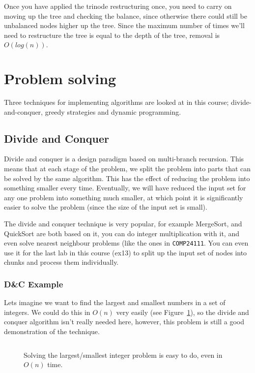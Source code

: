 Once you have applied the trinode restructuring once, you need to carry on
moving up the tree and checking the balance, since otherwise there could still
be unbalanced nodes higher up the tree. Since the maximum number of times we'll
need to restructure the tree is equal to the depth of the tree, removal is
$O(log(n))$.

\section{Problem solving}

Three techniques for implementing algorithms are looked at in this course;
divide-and-conquer, greedy strategies and dynamic programming.

\subsection{Divide and Conquer}

Divide and conquer is a design paradigm based on multi-branch recursion. This
means that at each stage of the problem, we split the problem into parts that
can be solved by the same algorithm. This has the effect of reducing the problem
into something smaller every time. Eventually, we will have reduced the input
set for any one problem into something much smaller, at which point it is
significantly easier to solve the problem (since the size of the input set is
small).

The divide and conquer technique is very popular, for example MergeSort, and
QuickSort are both based on it, you can do integer multiplication with it, and
even solve nearest neighbour problems (like the ones in \texttt{COMP24111}. You
can even use it for the last lab in this course (ex13) to split up the input set
of nodes into chunks and process them individually.

\subsubsection{D\&C Example}

Lets imagine we want to find the largest and smallest numbers in a set of
integers. We could do this in $O(n)$ very easily (see Figure~\ref{easy-soln}),
so the divide and conquer algorithm isn't really needed here, however, this
problem is still a good demonstration of the technique.

\begin{figure}[H]
  \label{easy-soln}
  \inputminted{java}{code/MinMax/Easy.java}
  \caption{Solving the largest/smallest integer problem is easy to do, even in
  $O(n)$ time.}
\end{figure}

